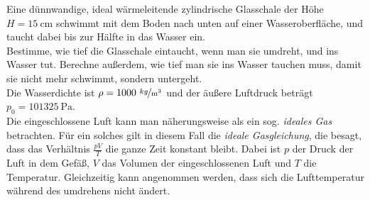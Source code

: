 \begin{Exercise}[title = Schwimmende Glasschale, origin = {Lucas Rettenmeier, Orpheus e.V.}, difficulty = 3, label = glass]
	Eine dünnwandige, ideal wärmeleitende  zylindrische Glasschale der Höhe $H = 15~\mathrm{cm}$ schwimmt mit dem Boden nach unten auf einer Wasseroberfläche, und taucht dabei bis zur Hälfte in das Wasser ein.\\
	Bestimme, wie tief die Glasschale eintaucht, wenn man sie umdreht, und ins Wasser tut. Berechne außerdem, wie tief man sie ins Wasser tauchen muss, damit sie nicht mehr schwimmt, sondern untergeht.\\
	Die Wasserdichte ist $\rho = 1000~\mathrm{\nicefrac{kg}{m^3}}$ und der äußere Luftdruck beträgt $p_0 = 101 325~\mathrm{Pa}$. \\ Die eingeschlossene Luft kann man näherungsweise als ein sog. \textit{ideales Gas} betrachten. Für ein solches gilt in diesem Fall die \textit{ideale Gasgleichung}, die besagt, dass das Verhältnis
			$\frac{pV}{T}$
	die ganze Zeit konstant bleibt. Dabei ist $p$ der Druck der Luft in dem Gefäß, $V$ das Volumen der eingeschlossenen Luft und $T$ die Temperatur. Gleichzeitig kann angenommen werden, dass sich die Lufttemperatur während des umdrehens nicht ändert. 
\end{Exercise}